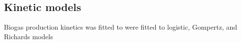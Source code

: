 \subsection{Kinetic models}
Biogas production kinetics was fitted to were fitted to logistic, Gompertz, and
Richards models